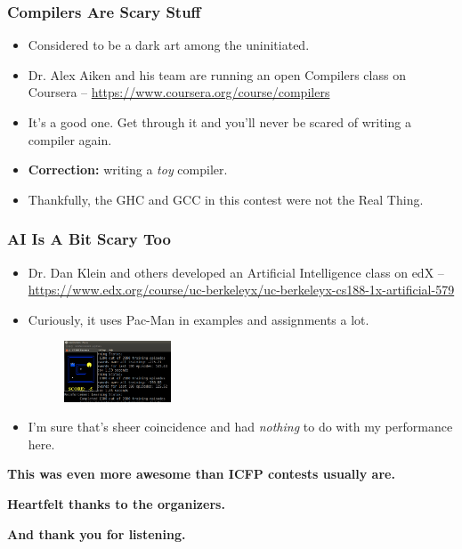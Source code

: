 \documentclass[t,aspectratio=169]{beamer}
\newif\ifcomplete
\begin{document}
\begin{frame}
  \frametitle{Compilers Are Scary Stuff}
  \begin{itemize}
    \item<1-> Considered to be a dark art among the uninitiated.
    \item<2-> Dr. Alex Aiken and his team are running an open Compilers class on Coursera -- \url{https://www.coursera.org/course/compilers}
    \item<3-> It's a good one. Get through it and you'll never be scared of writing a compiler again.
    \item<4-> \textbf{Correction:} writing a \textit{toy} compiler.
    \item<5-> Thankfully, the GHC and GCC in this contest were not the Real Thing.
  \end{itemize}
\end{frame}

\begin{frame}
  \frametitle{AI Is A Bit Scary Too}
  \begin{itemize}
    \item<1-> Dr. Dan Klein and others developed an Artificial Intelligence class on edX -- \url{https://www.edx.org/course/uc-berkeleyx/uc-berkeleyx-cs188-1x-artificial-579}
    \item<2-> Curiously, it uses Pac-Man in examples and assignments a lot.
    \begin{figure}[!h]
      \centering
      \includegraphics[width=0.3\textwidth]{cs188}
    \end{figure}
    \item<3-> I'm sure that's sheer coincidence and had \textit{nothing} to do with my performance here.
  \end{itemize}
\end{frame}

\fi

\begin{frame}[c]
  \begin{center}
    \textbf{This was even more awesome than ICFP contests usually are.}
  
    \textbf{Heartfelt thanks to the organizers.}
    
    \textbf{And thank you for listening.}
  \end{center}
\end{frame}

\ifcomplete

\begin{frame}[c]
  \begin{center}
    \textbf{And remember -- for the next year, Haskell is the programming tool of choice for discriminating hackers.}
  \end{center}
\end{frame}

\fi
\end{document}
